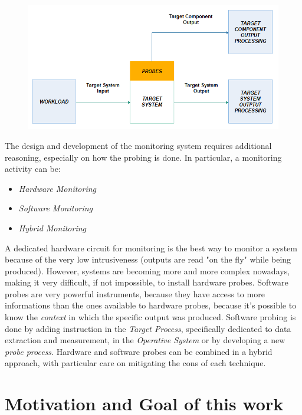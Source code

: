 \begin{figure}[h!]
	\includegraphics[width=\textwidth]{img/white-box.png}
	\caption{}
\end{figure}

The design and development of the monitoring system requires additional reasoning, especially on how the probing is done. In particular, a monitoring activity can be:

\begin{itemize}
	\item \textsl{Hardware Monitoring}
	\item \textsl{Software Monitoring}
	\item \textsl{Hybrid Monitoring}
\end{itemize}

A dedicated hardware circuit for monitoring is the best way to monitor a system because of the very low intrusiveness (outputs are read "on the fly" while being produced). However, systems are becoming more and more complex nowadays, making it very difficult, if not impossible, to install hardware probes.
Software probes are very powerful instruments, because they have access to more informations than the ones available to hardware probes, because it's possible to know the \textsl{context} in which the specific output was produced.
Software probing is done by adding instruction in the \textsl{Target Process}, specifically dedicated to data extraction and measurement, in the \textsl{Operative System} or by developing a new \textsl{probe process}.
Hardware and software probes can be combined in a hybrid approach, with particular care on mitigating the cons of each technique.

\section{Motivation and Goal of this work}

